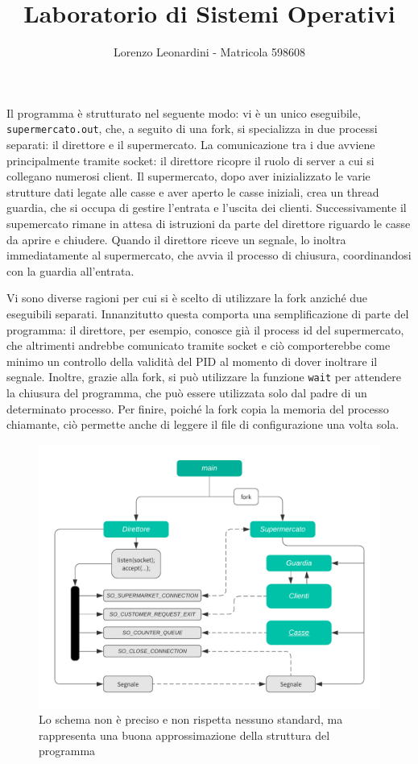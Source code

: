 \documentclass[a4paper,11pt] {article}
\title{\textbf{Laboratorio di Sistemi Operativi}}
\author{Lorenzo Leonardini - Matricola 598608}
\date{}
\begin{document}
\maketitle

Il programma è strutturato nel seguente modo: vi è un unico eseguibile, \lstinline{supermercato.out}, che, a seguito di una fork, si specializza in due processi separati: il direttore e il supermercato. La comunicazione tra i due avviene principalmente tramite socket: il direttore ricopre il ruolo di server a cui si collegano numerosi client. Il supermercato, dopo aver inizializzato le varie strutture dati legate alle casse e aver aperto le casse iniziali, crea un thread guardia, che si occupa di gestire l'entrata e l'uscita dei clienti. Successivamente il supemercato rimane in attesa di istruzioni da parte del direttore riguardo le casse da aprire e chiudere. Quando il direttore riceve un segnale, lo inoltra immediatamente al supermercato, che avvia il processo di chiusura, coordinandosi con la guardia all'entrata.

Vi sono diverse ragioni per cui si è scelto di utilizzare la fork anziché due eseguibili separati. Innanzitutto questa comporta una semplificazione di parte del programma: il direttore, per esempio, conosce già il process id del supermercato, che altrimenti andrebbe comunicato tramite socket e ciò comporterebbe come minimo un controllo della validità del PID al momento di dover inoltrare il segnale. Inoltre, grazie alla fork, si può utilizzare la funzione \lstinline{wait} per attendere la chiusura del programma, che può essere utilizzata solo dal padre di un determinato processo. Per finire, poiché la fork copia la memoria del processo chiamante, ciò permette anche di leggere il file di configurazione una volta sola.

\begin{figure}[!h]
	\begin{center}
		\includegraphics[width=.8\textwidth]{chart}
		\caption{\small Lo schema non è preciso e non rispetta nessuno standard, ma rappresenta una buona approssimazione della struttura del programma}
	\end{center}
\end{figure}
\end{document}
